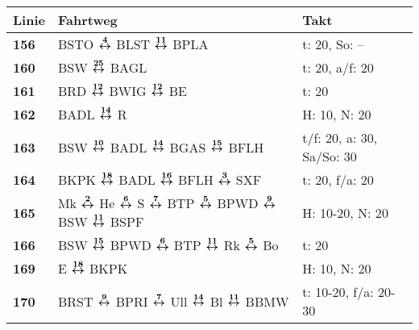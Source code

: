 \begin{minipage}[t]{0.45\textwidth}
\begin{tabular}{>{\bfseries}L{1.2cm}L{9.0cm}L{3.0cm}}
{\bfseries Linie} & {\bfseries Fahrtweg} & {\bfseries Takt} \\
\hline
\bus{} 156    & BSTO $\boldsymbol{\overset{4}{\leftrightarrow}}$ BLST $\boldsymbol{\overset{11}{\leftrightarrow}}$ BPLA                                                                                                                             & t: 20, So: --              \\
\bus{} 160    & BSW $\boldsymbol{\overset{25}{\leftrightarrow}}$ BAGL                                                                                                                                               & t: 20, a/f: 20             \\
\bus{} 161    & BRD $\boldsymbol{\overset{12}{\leftrightarrow}}$ BWIG $\boldsymbol{\overset{12}{\leftrightarrow}}$ BE                                                                                                                               & t: 20                      \\
\bus{} 162    & BADL $\boldsymbol{\overset{14}{\leftrightarrow}}$ R                                                                                                                                                 & H: 10, N: 20               \\
\bus{} 163    & BSW $\boldsymbol{\overset{10}{\leftrightarrow}}$ BADL $\boldsymbol{\overset{14}{\leftrightarrow}}$ BGAS $\boldsymbol{\overset{15}{\leftrightarrow}}$ BFLH                                                                                                           & t/f: 20, a: 30, Sa/So: 30  \\
\bus{} 164    & BKPK $\boldsymbol{\overset{18}{\leftrightarrow}}$ BADL $\boldsymbol{\overset{16}{\leftrightarrow}}$ BFLH $\boldsymbol{\overset{3}{\leftrightarrow}}$ SXF                                                                                                            & t: 20, f/a: 20             \\
\bus{} 165    & Mk $\boldsymbol{\overset{2}{\leftrightarrow}}$ He $\boldsymbol{\overset{6}{\leftrightarrow}}$ S $\boldsymbol{\overset{7}{\leftrightarrow}}$ BTP $\boldsymbol{\overset{5}{\leftrightarrow}}$ BPWD $\boldsymbol{\overset{9}{\leftrightarrow}}$ BSW $\boldsymbol{\overset{11}{\leftrightarrow}}$ BSPF                                                                  & H: 10-20, N: 20            \\
\bus{} 166    & BSW $\boldsymbol{\overset{15}{\leftrightarrow}}$ BPWD $\boldsymbol{\overset{6}{\leftrightarrow}}$ BTP $\boldsymbol{\overset{11}{\leftrightarrow}}$ Rk $\boldsymbol{\overset{5}{\leftrightarrow}}$ Bo                                                                                                & t: 20                      \\
\bus{} 169    & E $\boldsymbol{\overset{18}{\leftrightarrow}}$ BKPK                                                                                                                                                 & H: 10, N: 20               \\
\bus{} 170    & BRST $\boldsymbol{\overset{9}{\leftrightarrow}}$ BPRI $\boldsymbol{\overset{7}{\leftrightarrow}}$ Ull $\boldsymbol{\overset{14}{\leftrightarrow}}$ Bl $\boldsymbol{\overset{11}{\leftrightarrow}}$ BBMW                                                                                             & t: 10-20, f/a: 20-30       \\

\end{tabular}
\end{minipage}
